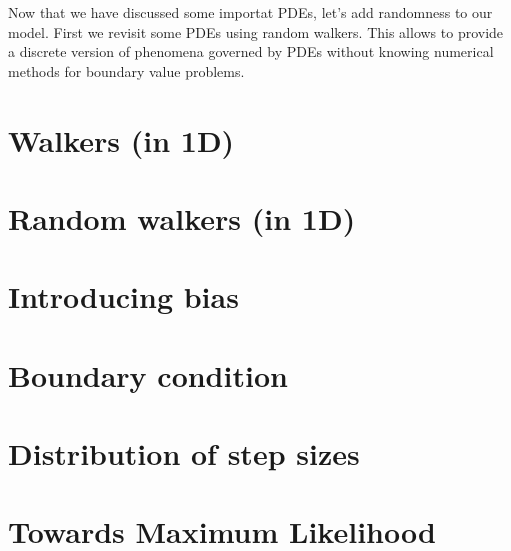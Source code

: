 \minitoc
Now that we have discussed some importat PDEs, let's add randomness to our model. First we revisit some PDEs using random walkers. This allows to provide a discrete version of phenomena governed by PDEs without knowing numerical methods for boundary value problems.

\section{Walkers (in 1D)}
\section{Random walkers (in 1D)}
\section{Introducing bias}
\section{Boundary condition}
\section{Distribution of step sizes}
\section{Towards Maximum Likelihood}